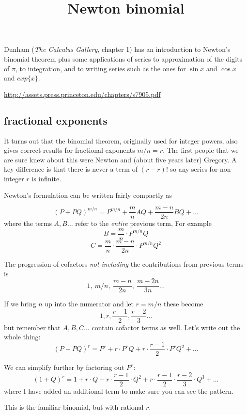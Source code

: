 \documentclass[11pt, oneside]{article}
\title{Newton binomial}
\date{}
\begin{document}
\maketitle
\Large


Dunham (\emph{The Calculus Gallery}, chapter 1) has an introduction to Newton's binomial theorem plus some applications of series to approximation of the digits of $\pi$, to integration, and to writing series such as the ones for $\sin x$ and $\cos x$ and $exp\{ x \}$.

\url{http://assets.press.princeton.edu/chapters/s7905.pdf}

\subsection*{fractional exponents}

It turns out that the binomial theorem, originally used for integer powers, also gives correct results for fractional exponents $m/n = r$.  The first people that we are sure knew about this were Newton and (about five years later) Gregory.  A key difference is that there is never a term of $(r-r)!$ so any series for non-integer $r$ is infinite.

Newton's formulation can be written fairly compactly as

\[ (P + PQ)^{m/n} = P^{m/n} + \frac{m}{n} AQ + \frac{m - n}{2n}BQ + \dots \]
where the terms $A, B \dots$ refer to the \emph{entire} previous term,   For example
\[ B =  \frac{m}{n} \cdot P^{m/n}Q \]
\[ C = \frac{m}{n} \cdot \frac{m - n}{2n} \cdot P^{m/n}Q^2 \]

The progression of cofactors \emph{not including} the contributions from previous terms is
\[ 1, \ m/n, \ \frac{m - n}{2n}, \ \frac{m - 2n}{3n} \dots \]

If we bring $n$ up into the numerator and let $r = m/n$ these become
\[ 1, r, \frac{r - 1}{2}, \frac{r - 2}{3} \dots \]
but remember that $A,B,C \dots$ contain cofactor terms as well.  Let's write out the whole thing:
\[ (P + PQ)^{r} = P^{r} + r \cdot P^{r}Q + r \cdot \frac{r - 1}{2} \cdot P^{r}Q^2 + \dots \]

We can simplify further by factoring out $P^{r}$:
\[ (1 + Q)^{r} = 1 + r \cdot Q + r \cdot \frac{r - 1}{2} \cdot Q^2 + r \cdot \frac{r - 1}{2} \cdot \frac{r - 2}{3} \cdot Q^3 + \dots \]
where I have added an additional term to make sure you can see the pattern.  

This is the familiar binomial, but with rational $r$.
\end{document}
